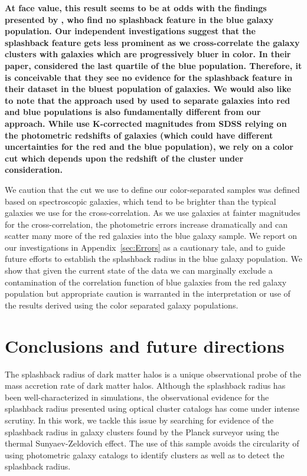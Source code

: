 \documentclass[iop, apjl, twocolappendix, numberedappendix]{emulateapj}
\begin{document}
\textbf{At face value, this result seems to be at odds with the findings
presented by \citet{baxter2017halo}, who find no splashback feature in the blue
galaxy population. Our independent investigations suggest that the splashback
feature gets less prominent as we cross-correlate the galaxy clusters with
galaxies which are progressively bluer in color. In their paper,
\citet{baxter2017halo} considered the last quartile of the blue population.
Therefore, it is conceivable that they see no evidence for the splashback
feature in their dataset in the bluest population of galaxies. We would also
like to note that the approach used by \citet{baxter2017halo} used to separate
galaxies into red and blue populations is also fundamentally different from our
approach. While \citet{baxter2017halo} use K-corrected magnitudes from SDSS
relying on the photometric redshifts of galaxies (which could have different
uncertainties for the red and the blue population), we rely on a color cut
which depends upon the redshift of the cluster under consideration.}

We caution that the cut we use to define our color-separated samples was
defined based on spectroscopic galaxies, which tend to be brighter
than the typical galaxies we use for the cross-correlation. As we use
galaxies at fainter magnitudes for the cross-correlation, the
photometric errors increase dramatically and can scatter many more of
the red galaxies into the blue galaxy sample. We report on
our investigations in Appendix~\ref{sec:Errors} as a cautionary tale,
and to guide future efforts to establish the splashback radius in the
blue galaxy population. We show that given the current state of the
data we can marginally exclude a contamination of the correlation
function of blue galaxies from the red galaxy population but
appropriate caution is warranted in the interpretation or use of the
results derived using the color separated galaxy populations.


\section{Conclusions and future directions}
\label{sec:Conclusions}
The splashback radius of dark matter halos is a unique observational
probe of the mass accretion rate of dark matter halos. Although the
splashback radius has been well-characterized in simulations, the
observational evidence for the splashback radius presented using
optical cluster catalogs has come under intense scrutiny. In this
work, we tackle this issue by searching for evidence of the
splashback radius in galaxy clusters found by the Planck surveyor using
the thermal Sunyaev-Zeldovich effect. The use of this sample avoids
the circularity of using photometric galaxy catalogs to identify
clusters as well as to detect the splashback radius.
\end{document}
